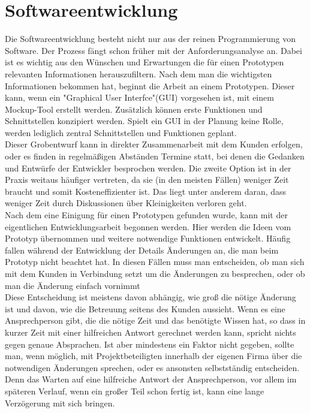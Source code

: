 \documentclass[10pt,a4paper]{article}
\begin{document}
\section{Softwareentwicklung}
Die Softwareentwicklung besteht nicht nur aus der reinen Programmierung von Software. Der Prozess fängt schon früher mit der Anforderungsanalyse an. Dabei ist es wichtig aus den Wünschen und Erwartungen die für einen Prototypen relevanten Informationen herauszufiltern. Nach dem man die wichtigsten Informationen bekommen hat, beginnt die Arbeit an einem Prototypen. Dieser kann, wenn ein "Graphical User Interfce"(GUI) vorgesehen ist, mit einem Mockup-Tool erstellt werden. Zusätzlich können erste Funktionen und  Schnittstellen konzipiert werden. Spielt ein GUI in der Planung keine Rolle, werden lediglich zentral Schnittstellen und Funktionen geplant. \\Dieser Grobentwurf kann in direkter Zusammenarbeit mit dem Kunden erfolgen, oder es finden in regelmäßigen Abständen Termine statt, bei denen die Gedanken und Entwürfe der Entwickler besprochen werden. Die zweite Option ist in der Praxis weitaus häufiger vertreten, da sie (in den meisten Fällen) weniger Zeit braucht und somit Kosteneffizienter ist. Das liegt unter anderem daran, dass weniger Zeit durch Diskussionen über Kleinigkeiten verloren geht.\\
Nach dem eine Einigung für einen Prototypen gefunden wurde, kann mit der eigentlichen Entwicklungsarbeit begonnen werden. Hier werden die Ideen vom Prototyp übernommen und weitere notwendige Funktionen entwickelt. Häufig fallen während der Entwicklung der Details Änderungen an, die man beim Prototyp nicht beachtet hat. In diesen Fällen muss man entscheiden, ob man sich mit dem Kunden in Verbindung setzt um die Änderungen zu besprechen, oder ob man die Änderung einfach vornimmt
\\Diese Entscheidung ist meistens davon abhängig, wie groß die nötige Änderung ist und davon, wie die Betreuung seitens des Kunden aussieht. Wenn es eine Ansprechperson gibt, die die nötige Zeit und das benötigte Wissen hat, so dass in kurzer Zeit mit einer hilfreichen Antwort gerechnet werden kann, spricht nichts gegen genaue Absprachen. Ist aber mindestens ein Faktor nicht gegeben, sollte man, wenn möglich, mit Projektbeteiligten innerhalb der eigenen Firma über die notwendigen Änderungen sprechen, oder es ansonsten selbstständig entscheiden. Denn das Warten auf eine hilfreiche Antwort der Ansprechperson, vor allem im späteren Verlauf, wenn ein großer Teil schon fertig ist, kann eine lange Verzögerung mit sich bringen.
\end{document}
